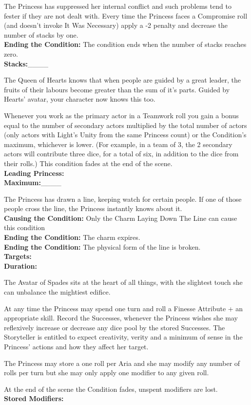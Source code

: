 \documentclass[10pt, frontgrid, backgrid]{flacards}
\begin{document}
{The Princess has suppressed her internal conflict and such problems tend to fester if they are not dealt with. Every time the Princess faces a Compromise roll (and doesn't invoke It Was Necessary) apply a -2 penalty and decrease the number of stacks by one. \\

\textbf{Ending the Condition:} The condition ends when the number of stacks reaches zero. \\
\textbf{Stacks:}\_\_\_\_}

{The Queen of Hearts knows that when people are guided by a great leader, the fruits of their labours become greater than the sum of it's parts. Guided by Hearts' avatar, your character now knows this too. 

Whenever you work as the primary actor in a Teamwork roll you gain a bonus equal to the number of secondary actors multiplied by the total number of actors (only actors with Light's Unity from the same Princess count) or the Condition's maximum, whichever is lower. (For example, in a team of 3, the 2 secondary actors will contribute three dice, for a total of six, in addition to the dice from their rolls.)
This condition fades at the end of the scene.\\
\textbf{Leading Princess:}\fillunderline\\
\textbf{Maximum:}\_\_\_\_
}

{The Princess has drawn a line, keeping watch for certain people. If one of those people cross the line, the Princess instantly knows about it. \\
\textbf{Causing the Condition:} Only the Charm Laying Down The Line can cause this condition\\
\textbf{Ending the Condition:} The charm expires. \\
\textbf{Ending the Condition:} The physical form of the line is broken.\\
\textbf{Targets:}\fillunderline \\
\textbf{Duration:}\fillunderline }

{The Avatar of Spades sits at the heart of all things, with the slightest touch she can unbalance the mightiest edifice. 

At any time the Princess may spend one turn and roll a Finesse Attribute + an appropriate skill. Record the Successes, whenever the Princess wishes she may reflexively increase or decrease any dice pool by the stored Successes. The Storyteller is entitled to expect creativity, verity and a minimum of sense in the Princess' actions and how they affect her target. 

The Princess may store a one roll per Aria and she may modify any number of rolls per turn but she may only apply one modifier to any given roll. 

At the end of the scene the Condition fades, unspent modifiers are lost. \\
\textbf{Stored Modifiers:} \fillunderline}
\end{document}
